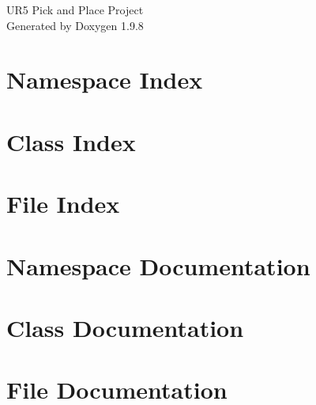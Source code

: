 \documentclass[twoside]{book}
\newcommand{\+}{\discretionary{\mbox{\scriptsize$\hookleftarrow$}}{}{}}
\newcommand{\clearemptydoublepage}{%
    \newpage{\pagestyle{empty}\cleardoublepage}%
  }
\begin{document}
  \raggedbottom
    \hypersetup{pageanchor=false,
                bookmarksnumbered=true,
                pdfencoding=unicode
               }
  \begin{titlepage}
  \vspace*{7cm}
  \begin{center}%
  {\Large UR5 Pick and Place Project}\\
  \vspace*{1cm}
  {\large Generated by Doxygen 1.9.8}\\
  \end{center}
  \end{titlepage}
  \clearemptydoublepage
  \tableofcontents
  \clearemptydoublepage
  \hypersetup{pageanchor=true}


\chapter{Namespace Index}

\chapter{Class Index}

\chapter{File Index}

\chapter{Namespace Documentation}





\chapter{Class Documentation}




\chapter{File Documentation}









  \backmatter
  \newpage
  \clearemptydoublepage
  \printindex
\end{document}
